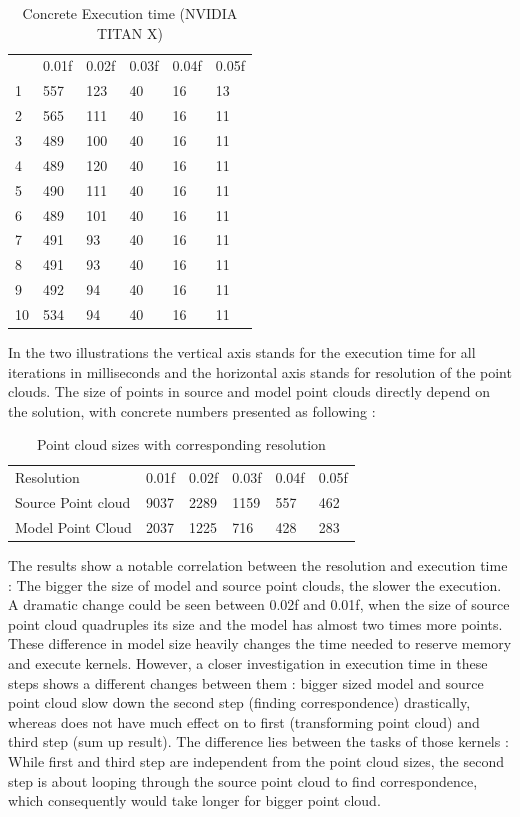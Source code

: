 \begin{table}[H]
\centering
\caption{Concrete Execution time (NVIDIA TITAN X)}
\begin{tabular}{llllll}
   & 0.01f & 0.02f & 0.03f & 0.04f & 0.05f \\
1  & 557   & 123   & 40    & 16    & 13    \\
2  & 565   & 111   & 40    & 16    & 11    \\
3  & 489   & 100   & 40    & 16    & 11    \\
4  & 489   & 120   & 40    & 16    & 11    \\
5  & 490   & 111   & 40    & 16    & 11    \\
6  & 489   & 101   & 40    & 16    & 11    \\
7  & 491   & 93    & 40    & 16    & 11    \\
8  & 491   & 93    & 40    & 16    & 11    \\
9  & 492   & 94    & 40    & 16    & 11    \\
10 & 534   & 94    & 40    & 16    & 11   
\end{tabular}
\end{table}

In the two illustrations the vertical axis stands for the execution time for all iterations in milliseconds and the horizontal axis stands for resolution of the point clouds. The size of points in source and model point clouds directly depend on the solution, with concrete numbers presented as following :



\begin{table}[H]
\centering
\caption{Point cloud sizes with corresponding resolution}
\label{my-label}
\begin{tabular}{llllll}
Resolution         & 0.01f & 0.02f & 0.03f & 0.04f & 0.05f \\
Source Point cloud & 9037  & 2289  & 1159  & 557   & 462   \\
Model Point Cloud  & 2037  & 1225  & 716   & 428   & 283  
\end{tabular}
\end{table}
\newpage
The results show a notable correlation between the resolution and execution time :  The bigger the size of model and source point clouds, the slower the execution. A dramatic change could be seen between 0.02f and 0.01f, when the size of source point cloud quadruples its size and the model has almost two times more points. These difference in model size heavily changes the time needed to reserve memory and execute kernels. However, a closer investigation in execution time in these steps shows a different changes between them : bigger sized model and source point cloud slow down the second step (finding correspondence) drastically, whereas does not have much effect on to first (transforming point cloud) and third step (sum up result). The difference lies between the tasks of those kernels : While first and third step are independent from the point cloud sizes, the second step is about looping through the source point cloud to find correspondence, which consequently would take longer for bigger point cloud. 

